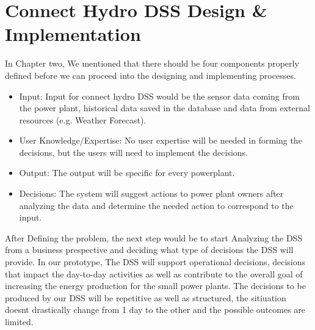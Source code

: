 \section{Connect Hydro DSS Design \& Implementation}
In Chapter two, We mentioned that there should be four components properly defined before we can proceed into the designing and implementing processes.
\begin{itemize}
	\item Input: Input for connect hydro DSS would be the sensor data coming from the power plant, historical data saved in the database and data from external resources (e.g. Weather Forecast).
	\item User Knowledge/Expertise: No user expertise will be needed in forming the decisions, but the users will need to implement the decisions.
	\item Output: The output will be specific for every powerplant.
	\item Decisions: The system will suggest actions to power plant owners after analyzing the data and determine the needed action to correspond to the input.
\end{itemize}
After Defining the problem, the next step would be to start Analyzing the DSS from a business prespective and deciding what type of decisions the DSS will provide. In our prototype, The DSS will support operational decisions, decisions that impact the day-to-day activities as well as contribute to the overall goal of increasing the energy production for the small power plants. The decisions to be produced by our DSS will be repetitive as well as structured, the sitiuation doesnt drastically change from 1 day to the other and the possible outcomes are limited.

